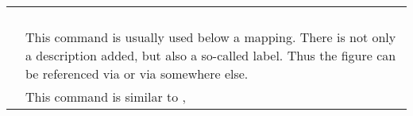\begin{footnotesize}
\begin{longtable}{ | P{0.55\textwidth} | p{0.4\textwidth} | }
        \hline
                                  &
        \tsArrowLeftDouble{}                                                                                 \\
        \hline
                                          &
        \tsArrowUp{}                                                                                         \\
        \hline
                                    &
        \tsArrowUpDouble{}                                                                                   \\
        \hline
                                        &
        \tsBackslash{}                                                                                       \\
        \hline
                                           &
        \tsBullet{}                                                                                          \\
        \hline
                         &
        This command is usually used below a mapping. There is not only a
        description added, but also a so-called label. Thus the figure can be
        referenced via
        or via
        somewhere else.                                                                                      \\
        \hline
                       &
        This command is similar to
        ,

\end{longtable}
\end{footnotesize}
